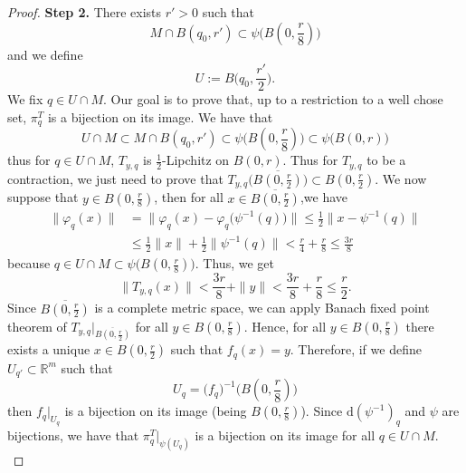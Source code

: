 \documentclass[11pt,reqno,a4paper]{article}%
\theoremstyle{definition}
\theoremstyle{remark}
\renewcommand{\leq}{\leqslant}
\renewcommand{\d}{\mathrm{d}}
\newcommand{\R}{\mathbb{R}}
\renewcommand{\d}{\mathrm{d}}
\begin{document}
\begin{proof}
    \noindent \textbf{Step 2.}
    There exists $r' > 0$ such that 
    $$M \cap B(q_0,r') \subset \psi \big( B(0,\frac{r}{8}) \big)$$ 
    and we define
    $$U := B\Big(q_0, \frac{r'}{2}\Big).$$
    We fix $q \in U \cap M$. 
    Our goal is to prove that, up to a restriction to a well chose set, $\pi^T_{q}$ is a bijection on its image.
    We have that 
    $$U \cap M \subset M \cap B(q_0,r') \subset \psi \big( B(0,\frac{r}{8}) \big) \subset \psi \big( B(0,r) \big)$$
    thus for $q \in U \cap M$, $T_{y,q}$ is $\frac{1}{2}$-Lipchitz on $ B(0,r)$.
    Thus for $T_{y,q}$ to be a contraction, we just need to prove that $T_{y,q} \big( \overline{B(0,\frac{r}{2})} \big) \subset  B(0,\frac{r}{2})$.
    We now suppose that $y \in B(0,\frac{r}{8})$, then for all $x \in \overline{B(0,\frac{r}{2})}$,we have
    \begin{align*}
        \| \varphi_{q}(x) \| &= \| \varphi_{q}(x) - \varphi_{q}\big(\psi^{-1} (q)\big) \| \leq \frac{1}{2} \| x-\psi^{-1}(q) \| \\
        &\leq \frac{1}{2} \| x \| + \frac{1}{2} \| \psi^{-1}(q) \| < \frac{r}{4} + \frac{r}{8} \leq \frac{3r}{8}
    \end{align*}
    because $q \in U \cap M \subset \psi \big( B(0,\frac{r}{8}) \big)$.
    Thus, we get
    $$\|T_{y,q}(x) \| < \frac{3r}{8} + \|y \| <  \frac{3r}{8} + \frac{r}{8} \leq \frac{r}{2}.$$
    Since $  \overline{B(0,\frac{r}{2})}$ is a complete metric space, we can apply Banach fixed point theorem of $T_{y,q} |_{\overline{B(0,\frac{r}{2})}}$ for all $y \in B(0,\frac{r}{8})$.
    Hence, for all $y \in B(0,\frac{r}{8})$ there exists a unique $x \in B(0,\frac{r}{2})$ such that $f_q(x)=y$.
    Therefore, if we define $U_{q'} \subset \R^m$ such that 
    $$U_{q} = \big(f_{q}\big)^{-1} \big( B(0,\frac{r}{8}) \big)$$
    then $f_{q} |_{U_{q}}$ is a bijection on its image (being $B(0,\frac{r}{8})$).
    Since $\d (\psi^{-1})_q$ and $\psi$ are bijections, we have that 
    $\pi^T_{q} |_{\psi(U_{q})}$ is a bijection on its image for all $q \in U \cap M$.\\


\end{proof}
\end{document}
